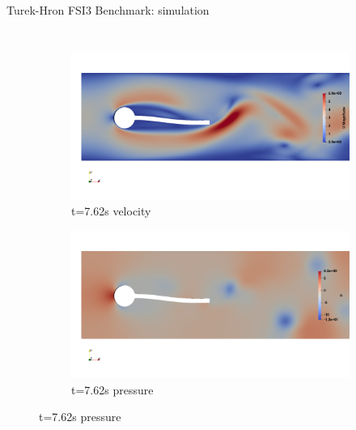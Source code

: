 \documentclass[10pt,t]{beamer}
\begin{document}
\begin{frame}{Turek-Hron FSI3 Benchmark: simulation}
\begin{columns}
\begin{figure}[htb]
\medskip

\begin{subfigure}{0.5\textwidth}
  \includegraphics[width=\linewidth, trim=0 120 0 120, clip]{images/FSI3/fsi3_v2.png}
  \caption{t=7.62s velocity}
  \label{fig:fsi3_v2}
\end{subfigure}\hfil %
\begin{subfigure}{0.5\textwidth}
  \includegraphics[width=\linewidth, trim=0 120 0 120, clip]{images/FSI3/fsi3_p2.png}
  \caption{t=7.62s pressure}
  \label{fig:fsi3_p2}
\end{subfigure}\hfil %

\medskip


\end{figure}
\end{columns}
\end{frame}
\end{document}
